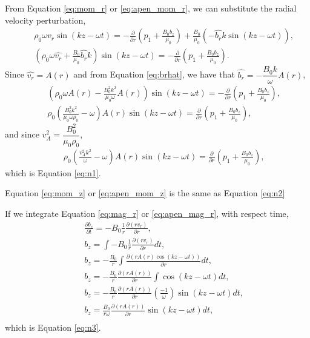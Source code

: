 From Equation \ref{eq:mom_r} or \ref{eq:apen_mom_r}, we can substitute the radial velocity perturbation, 
\begin{align}
    &&\rho_0 \omega \hat{v_r} \sin(kz-\omega t) =-\frac{\partial}{\partial r}
    \left(p_1+\frac{B_0b_z}{\mu_0}\right)+\frac{B_0}{\mu_0}\left(-\hat{b_r}k\sin(kz-\omega t)\right),\\
    &&\left(\rho_0 \omega \hat{v_r} + \frac{B_0}{\mu_0}\hat{b_r}k \right)\sin(kz-\omega t) =-\frac{\partial}{\partial r}\left(p_1+\frac{B_0b_z}{\mu_0}\right).
\end{align}
Since $\hat{v_r} = A(r)$ and from Equation \ref{eq:brhat}, we have that $\hat{b_r} = -\dfrac{B_0 k}{\omega}A(r)$,
\begin{align}
&&\left(\rho_0 \omega A(r) - \frac{B_0^2 k^2}{\mu_0 \omega}A(r) \right)\sin(kz-\omega t) =-\frac{\partial}{\partial r}\left(p_1+\frac{B_0b_z}{\mu_0}\right),\\
&&\rho_0 \left(\frac{B_0^2 k^2}{\mu_0 \omega \rho_0} - \omega \right)A(r)\sin(kz-\omega t) =\frac{\partial}{\partial r}\left(p_1+\frac{B_0b_z}{\mu_0}\right),
\end{align}
and since $v_A^2 = \dfrac{B_0^2}{\mu_0\rho_0}$,
\begin{align}
&&\rho_0 \left(\frac{v_A^2 k^2}{\omega} - \omega \right)A(r)\sin(kz-\omega t) =\frac{\partial}{\partial r}\left(p_1+\frac{B_0b_z}{\mu_0}\right),
\end{align}
which is Equation \ref{eq:n1}.

Equation \ref{eq:mom_z} or \ref{eq:apen_mom_z} is the same as Equation \ref{eq:n2}

If we integrate Equation \ref{eq:mag_r} or \ref{eq:apen_mag_r}, with respect time,
\begin{align}
&&\frac{\partial b_z}{\partial t}=-B_0\frac{1}{r}\frac{\partial (rv_r)}{\partial r},\\
&& b_z = \int -B_0\frac{1}{r}\frac{\partial (rv_r)}{\partial r} dt,\\
&& b_z =  -\frac{B_0}{r}\int\frac{\partial (rA(r)\cos(kz-\omega t))}{\partial r} dt,\\
&& b_z =  -\frac{B_0}{r}\frac{\partial (rA(r))}{\partial r}\int \cos(kz-\omega t) dt,\\
&& b_z =  -\frac{B_0}{r}\frac{\partial (rA(r))}{\partial r}\left(\frac{-1}{\omega}\right) \sin(kz-\omega t) dt,\\
&& b_z =  \frac{B_0}{r\omega}\frac{\partial (rA(r))}{\partial r}\sin(kz-\omega t) dt,\\
\end{align}
which is Equation \ref{eq:n3}.

